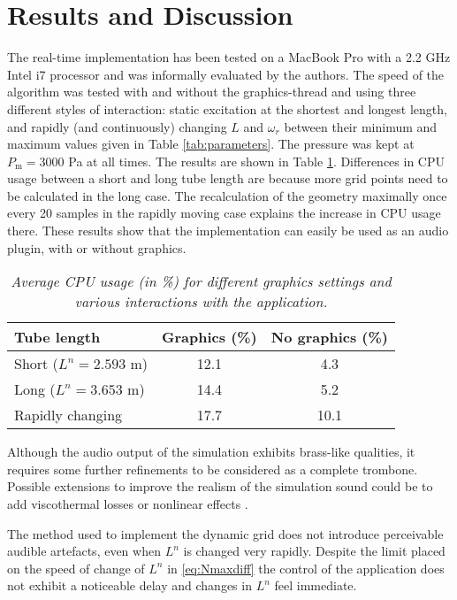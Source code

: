 \section{Results and Discussion}\label{sec:resDisc}
The real-time implementation has been tested on a MacBook Pro with a 2.2 GHz Intel i7 processor and was informally evaluated by the authors. The speed of the algorithm was tested with and without the graphics-thread and using three different styles of interaction: static excitation at the shortest and longest length, and rapidly (and continuously) changing $L$ and $\omega_r$ between their minimum and maximum values given in Table \ref{tab:parameters}. The pressure was kept at $P_\text{m} = 3000$ Pa at all times. The results are shown in Table \ref{tab:CPU}. Differences in CPU usage between a short and long tube length are because more grid points need to be calculated in the long case. The recalculation of the geometry maximally once every 20 samples in the rapidly moving case explains the increase in CPU usage there. %
These results show that the implementation can easily be used as an audio plugin, with or without graphics.
\begin{table}[ht]
    \small
    \begin{center}
    \caption{\it Average CPU usage (in \%) for different graphics settings and various interactions with the application. \label{tab:CPU}}
    \begin{tabular}{|l|c|c|}
        \hline
        Tube length & Graphics (\%) & No graphics (\%)\\\hline
        Short ($L^n = 2.593$ m) & 12.1 & 4.3\\
        Long ($L^n = 3.653$ m) & 14.4 & 5.2 
        \\
        Rapidly changing & 17.7 & 10.1\\\hline    \end{tabular}
    \end{center}
\end{table}

Although the audio output of the simulation exhibits brass-like qualities, it requires some further refinements to be considered as a complete trombone. Possible extensions to improve the realism of the simulation sound could be to add viscothermal losses \cite{Harrison2016} or nonlinear effects \cite{msallam1997physical}.

The method used to implement the dynamic grid does not introduce perceivable audible artefacts, even when $L^n$ is changed very rapidly. Despite the limit placed on the speed of change of $L^n$ in \eqref{eq:Nmaxdiff} the control of the application does not exhibit a noticeable delay and changes in $L^n$ feel immediate.

